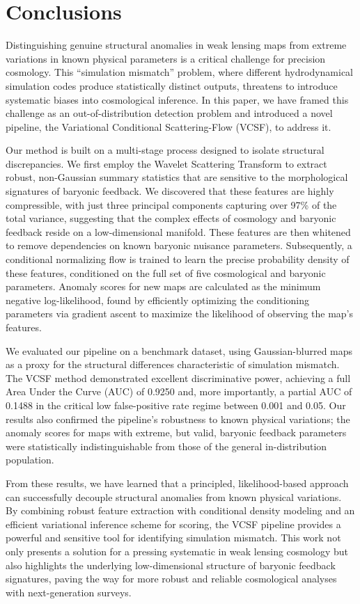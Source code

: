 \documentclass[]{article}
\begin{document}
\section{Conclusions}
\label{sec:conclusions}


Distinguishing genuine structural anomalies in weak lensing maps from extreme variations in known physical parameters is a critical challenge for precision cosmology. This ``simulation mismatch'' problem, where different hydrodynamical simulation codes produce statistically distinct outputs, threatens to introduce systematic biases into cosmological inference. In this paper, we have framed this challenge as an out-of-distribution detection problem and introduced a novel pipeline, the Variational Conditional Scattering-Flow (VCSF), to address it.

Our method is built on a multi-stage process designed to isolate structural discrepancies. We first employ the Wavelet Scattering Transform to extract robust, non-Gaussian summary statistics that are sensitive to the morphological signatures of baryonic feedback. We discovered that these features are highly compressible, with just three principal components capturing over 97\% of the total variance, suggesting that the complex effects of cosmology and baryonic feedback reside on a low-dimensional manifold. These features are then whitened to remove dependencies on known baryonic nuisance parameters. Subsequently, a conditional normalizing flow is trained to learn the precise probability density of these features, conditioned on the full set of five cosmological and baryonic parameters. Anomaly scores for new maps are calculated as the minimum negative log-likelihood, found by efficiently optimizing the conditioning parameters via gradient ascent to maximize the likelihood of observing the map's features.

We evaluated our pipeline on a benchmark dataset, using Gaussian-blurred maps as a proxy for the structural differences characteristic of simulation mismatch. The VCSF method demonstrated excellent discriminative power, achieving a full Area Under the Curve (AUC) of 0.9250 and, more importantly, a partial AUC of 0.1488 in the critical low false-positive rate regime between 0.001 and 0.05. Our results also confirmed the pipeline's robustness to known physical variations; the anomaly scores for maps with extreme, but valid, baryonic feedback parameters were statistically indistinguishable from those of the general in-distribution population.

From these results, we have learned that a principled, likelihood-based approach can successfully decouple structural anomalies from known physical variations. By combining robust feature extraction with conditional density modeling and an efficient variational inference scheme for scoring, the VCSF pipeline provides a powerful and sensitive tool for identifying simulation mismatch. This work not only presents a solution for a pressing systematic in weak lensing cosmology but also highlights the underlying low-dimensional structure of baryonic feedback signatures, paving the way for more robust and reliable cosmological analyses with next-generation surveys.


{}

\end{document}
